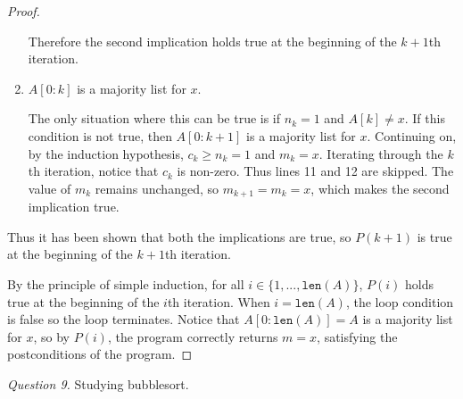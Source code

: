 \documentclass[11pt]{article}
\begin{document}
\begin{proof}
\begin{enumerate}
            Therefore the second implication holds true at the beginning of the \(k+1\)th iteration.

            \item \(A[0:k]\) is a majority list for \(x\).
            
            The only situation where this can be true is if \(n_k = 1\) and \(A[k] \neq x\). If this condition is not true, then \(A[0:k+1]\) is a majority list for \(x\). Continuing on, by the induction hypothesis, \(c_k \geq n_k = 1\) and \(m_k = x\). Iterating through the \(k\)th iteration, notice that \(c_k\) is non-zero. Thus lines 11 and 12 are skipped. The value of \(m_k\) remains unchanged, so \(m_{k+1} = m_k = x\), which makes the second implication true.
        \end{enumerate}
        Thus it has been shown that both the implications are true, so \(P(k+1)\) is true at the beginning of the \(k+1\)th iteration.

        By the principle of simple induction, for all \(i \in \{1,...,\texttt{len}(A)\}\), \(P(i)\) holds true at the beginning of the \(i\)th iteration. When \(i = \texttt{len}(A)\), the loop condition is false so the loop terminates. Notice that \(A[0:\texttt{len}(A)] = A\) is a majority list for \(x\), so by \(P(i)\), the program correctly returns \(m = x\), satisfying the postconditions of the program.
        
    \end{proof}
    \textit{Question 9.} Studying bubblesort.
\end{document}
